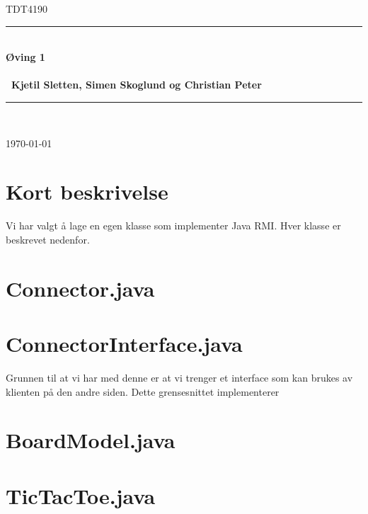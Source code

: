 \documentclass[11pt, a4paper]{article}	%
\begin{document}
\begin{titlepage}
\newcommand{\HRule}{\rule{\linewidth}{0.5mm}}
 
\begin{center}
 

\textsc{\huge TDT4190 }\\[2.0cm]

 
\HRule \\[0.3cm]
{\huge \bfseries  Øving  1
\\\ \\\ \LARGE Kjetil Sletten, Simen Skoglund og Christian Peter }\\[0.4cm]
\HRule \\[1.5cm]
 
\vfill
 
{\large \today}
 
\end{center}
\end{titlepage}

\section{Kort beskrivelse}
Vi har valgt å lage en egen klasse som implementer Java RMI. Hver klasse er beskrevet nedenfor.

\section{Connector.java}

\section{ConnectorInterface.java}
Grunnen til at vi har med denne er at vi trenger et interface som kan brukes av klienten på den andre siden. Dette grensesnittet implementerer 

\section{BoardModel.java}

\section{TicTacToe.java}


\newpage
\begin{thebibliography}{2}


\end{thebibliography}
\end{document}
